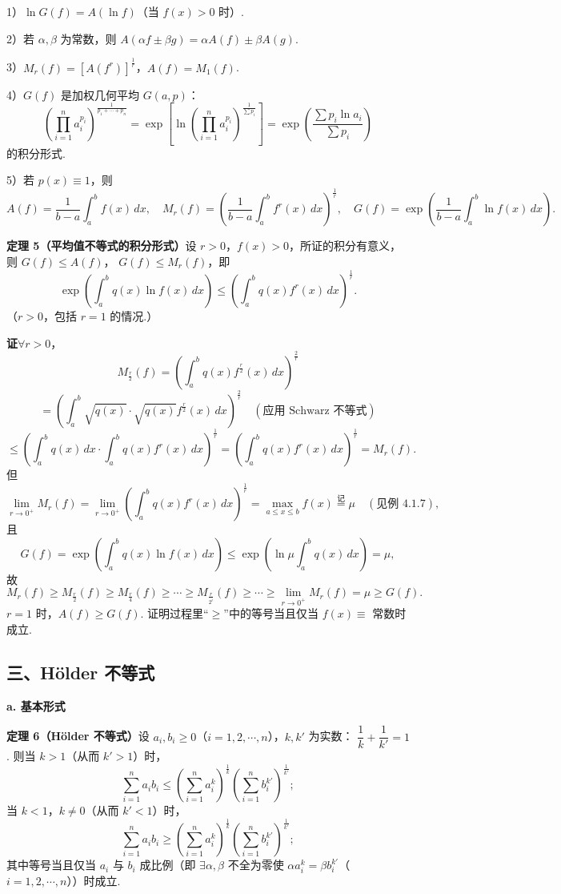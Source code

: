 \documentclass[UTF8, 12pt, fontset=fandol, oneside]{ctexart}
\begin{document}
1）$\ln G(f)=A(\ln f)$（当 $f(x)>0$ 时）.

2）若 $\alpha,\beta$ 为常数，则 $A(\alpha f\pm\beta g)=\alpha A(f)\pm\beta A(g)$.

3）$M_r(f)=[A(f^r)]^{\frac1r}$，$A(f)=M_1(f)$.

4）$G(f)$ 是加权几何平均 $G(a,p)$：
\[
\left(\prod_{i=1}^n a_i^{p_i}\right)^{\frac1{p_1+\cdots+p_n}}
=\exp\left[\ln\left(\prod_{i=1}^n a_i^{p_i}\right)^{\frac1{\sum p_i}}\right]
=\exp\left(\frac{\sum p_i\ln a_i}{\sum p_i}\right)
\]
的积分形式.

5）若 $p(x)\equiv1$，则
\[
A(f)=\frac1{b-a}\int_a^b f(x)\,dx,\quad
M_r(f)=\left(\frac1{b-a}\int_a^b f^r(x)\,dx\right)^{\frac1r},\quad
G(f)=\exp\left(\frac1{b-a}\int_a^b\ln f(x)\,dx\right).
\]

\noindent\textbf{定理 5（平均值不等式的积分形式）}\quad 设 $r>0$，$f(x)>0$，所证的积分有意义，则 $G(f)\le A(f)$，
$G(f)\le M_r(f)$，即
\[
\exp\left(\int_a^b q(x)\ln f(x)\,dx\right)
\le\left(\int_a^b q(x)f^r(x)\,dx\right)^{\frac1r}.
\]
（$r>0$，包括 $r=1$ 的情况.）

\noindent\textbf{证}\quad $\forall r>0$，
\[
M_{\frac r2}(f)=\left(\int_a^b q(x)f^{\frac r2}(x)\,dx\right)^{\frac2r}
\]
\[
=\left(\int_a^b\sqrt{q(x)}\cdot\sqrt{q(x)}f^{\frac r2}(x)\,dx\right)^{\frac2r}\quad(\text{应用 Schwarz 不等式})
\]
\[
\le\left(\int_a^b q(x)\,dx\cdot\int_a^b q(x)f^r(x)\,dx\right)^{\frac1r}
=\left(\int_a^b q(x)f^r(x)\,dx\right)^{\frac1r}=M_r(f).
\]
但
\[
\lim_{r\to0^+}M_r(f)
=\lim_{r\to0^+}\left(\int_a^b q(x)f^r(x)\,dx\right)^{\frac1r}
=\max_{a\le x\le b}f(x)\stackrel{\text{记}}{=}\mu\quad(\text{见例 4.1.7}),
\]
且
\[
G(f)=\exp\left(\int_a^b q(x)\ln f(x)\,dx\right)
\le \exp\left(\ln\mu\int_a^b q(x)\,dx\right)=\mu,
\]
故
\[
M_r(f)\ge M_{\frac r2}(f)\ge M_{\frac r4}(f)\ge\cdots\ge
M_{\frac r{2^i}}(f)\ge\cdots\ge\lim_{r\to0^+}M_r(f)=\mu\ge G(f).
\]
$r=1$ 时，$A(f)\ge G(f)$. 证明过程里“$\ge$”中的等号当且仅当 $f(x)\equiv$ 常数时成立.

\subsection*{三、Hölder 不等式}

\noindent\textbf{a. 基本形式}

\noindent\textbf{定理 6（Hölder 不等式）}\quad 设 $a_i,b_i\ge0$（$i=1,2,\cdots,n$），$k,k'$ 为实数：
$\dfrac1k+\dfrac1{k'}=1$. 则当 $k>1$（从而 $k'>1$）时，
\[
\sum_{i=1}^n a_i b_i
\le \left(\sum_{i=1}^n a_i^k\right)^{\frac1k}
\left(\sum_{i=1}^n b_i^{k'}\right)^{\frac1{k'}}; \tag{1}
\]
当 $k<1$，$k\ne0$（从而 $k'<1$）时，
\[
\sum_{i=1}^n a_i b_i
\ge \left(\sum_{i=1}^n a_i^k\right)^{\frac1k}
\left(\sum_{i=1}^n b_i^{k'}\right)^{\frac1{k'}}; \tag{2}
\]
其中等号当且仅当 $a_i$ 与 $b_i$ 成比例（即 $\exists\alpha,\beta$ 不全为零使
$\alpha a_i^k=\beta b_i^{k'}$（$i=1,2,\cdots,n$））时成立.
\end{document}
